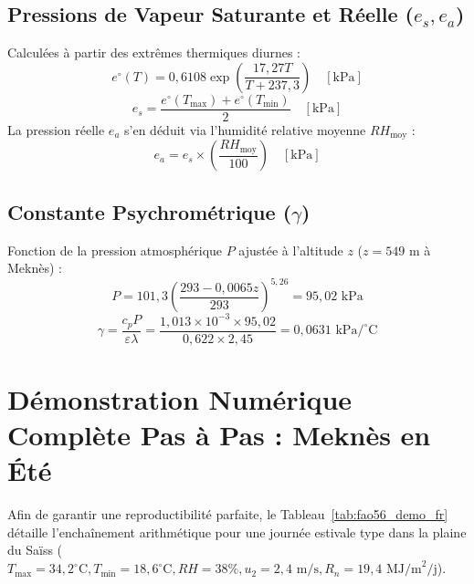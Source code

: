 \documentclass[11pt,a4paper,oneside]{report}
\begin{document}
\subsection{Pressions de Vapeur Saturante et Réelle ($e_s, e_a$)}
Calculées à partir des extrêmes thermiques diurnes :
\begin{equation}
e^\circ(T) = 0,6108 \exp\left( \frac{17,27 T}{T + 237,3} \right) \quad [\text{kPa}]
\end{equation}
\begin{equation}
e_s = \frac{e^\circ(T_{\max}) + e^\circ(T_{\min})}{2} \quad [\text{kPa}]
\end{equation}
La pression réelle $e_a$ s'en déduit via l'humidité relative moyenne $RH_{\text{moy}}$ :
\begin{equation}
e_a = e_s \times \left( \frac{RH_{\text{moy}}}{100} \right) \quad [\text{kPa}]
\end{equation}

\subsection{Constante Psychrométrique ($\gamma$)}
Fonction de la pression atmosphérique $P$ ajustée à l'altitude $z$ ($z = 549\text{ m}$ à Meknès) :
\begin{equation}
P = 101,3 \left( \frac{293 - 0,0065 z}{293} \right)^{5,26} = 95,02\text{ kPa}
\end{equation}
\begin{equation}
\gamma = \frac{c_p P}{\varepsilon \lambda} = \frac{1,013 \times 10^{-3} \times 95,02}{0,622 \times 2,45} = 0,0631\text{ kPa/}^\circ\text{C}
\end{equation}

\section{Démonstration Numérique Complète Pas à Pas : Meknès en Été}
Afin de garantir une reproductibilité parfaite, le Tableau~\ref{tab:fao56_demo_fr} détaille l'enchaînement arithmétique pour une journée estivale type dans la plaine du Saïss ($T_{\max}=34,2^\circ\text{C}, T_{\min}=18,6^\circ\text{C}, RH=38\%, u_2=2,4\text{ m/s}, R_n=19,4\text{ MJ/m}^2/\text{j}$).
\end{document}
